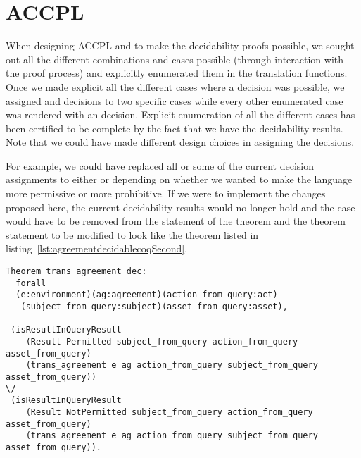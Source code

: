 \section{ACCPL}

When designing \ac{ACCPL} and to make the decidability proofs possible, we sought out all the different combinations and cases possible (through interaction with the proof process) and explicitly enumerated them in the translation functions. Once we made explicit all the different cases where a decision was possible, we assigned  and  decisions to two specific cases while every other enumerated case was rendered with an  decision. Explicit enumeration of all the different cases has been certified to be complete by the fact that we have the decidability results. Note that we could have made different design choices in assigning the decisions. 

For example, we could have replaced all or some of the current  decision assignments to either  or  depending on whether we wanted to make the language more permissive or more prohibitive. If we were to implement the changes proposed here, the current decidability results would no longer hold and the  case would have to be removed from the statement of the theorem and the theorem statement to be modified to look like the theorem listed in listing~\ref{lst:agreementdecidablecoqSecond}.

\begin{minipage}[c]{0.95\textwidth}
\begin{lstlisting}
Theorem trans_agreement_dec:
  forall
  (e:environment)(ag:agreement)(action_from_query:act)
   (subject_from_query:subject)(asset_from_query:asset),

 (isResultInQueryResult 
    (Result Permitted subject_from_query action_from_query asset_from_query)
    (trans_agreement e ag action_from_query subject_from_query asset_from_query)) 
\/
 (isResultInQueryResult 
    (Result NotPermitted subject_from_query action_from_query asset_from_query)
    (trans_agreement e ag action_from_query subject_from_query asset_from_query)).

\end{lstlisting}
\end{minipage}



